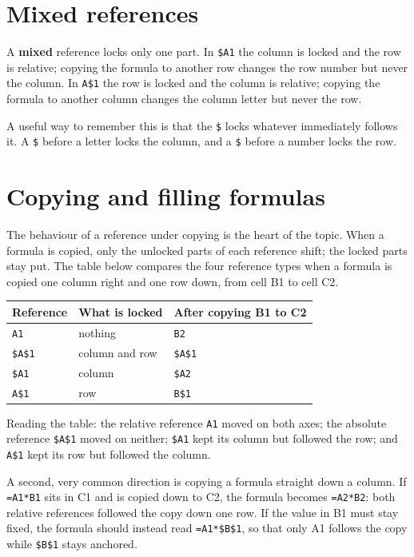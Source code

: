 \section{Mixed references}
A \textbf{mixed} reference locks only one part. In \texttt{\$A1} the column is
locked and the row is relative; copying the formula to another row changes the
row number but never the column. In \texttt{A\$1} the row is locked and the
column is relative; copying the formula to another column changes the column
letter but never the row.

A useful way to remember this is that the \texttt{\$} locks whatever
immediately follows it. A \texttt{\$} before a letter locks the column, and a
\texttt{\$} before a number locks the row.

\section{Copying and filling formulas}
The behaviour of a reference under copying is the heart of the topic. When a
formula is copied, only the unlocked parts of each reference shift; the locked
parts stay put. The table below compares the four reference types when a
formula is copied one column right and one row down, from cell B1 to cell C2.

\begin{center}
\begin{tabular}{p{}p{}p{}}
\toprule
\textbf{Reference} & \textbf{What is locked} & \textbf{After copying B1 to C2} \\
\midrule
\texttt{A1} & nothing & \texttt{B2} \\
\texttt{\$A\$1} & column and row & \texttt{\$A\$1} \\
\texttt{\$A1} & column & \texttt{\$A2} \\
\texttt{A\$1} & row & \texttt{B\$1} \\
\bottomrule
\end{tabular}
\end{center}

Reading the table: the relative reference \texttt{A1} moved on both axes; the
absolute reference \texttt{\$A\$1} moved on neither; \texttt{\$A1} kept its
column but followed the row; and \texttt{A\$1} kept its row but followed the
column.

A second, very common direction is copying a formula straight down a column.
If \texttt{=A1*B1} sits in C1 and is copied down to C2, the formula becomes
\texttt{=A2*B2}: both relative references followed the copy down one row. If
the value in B1 must stay fixed, the formula should instead read
\texttt{=A1*\$B\$1}, so that only A1 follows the copy while \texttt{\$B\$1}
stays anchored.

